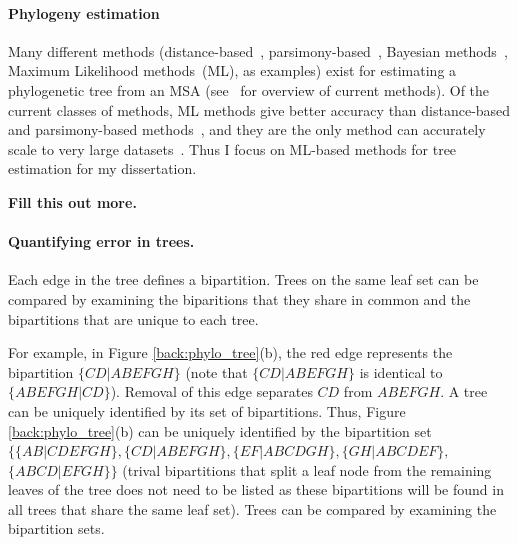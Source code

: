 
\paragraph{Phylogeny estimation}\label{back:tree_estimation}
Many different methods (distance-based~\cite{todo}, parsimony-based~\cite{todo}, Bayesian methods~\cite{todo}, Maximum Likelihood methods~\cite{todo}(ML), as examples) exist for estimating a phylogenetic tree from an MSA (see~\cite{Huelsenbeck1995,Holder2003} for overview of current methods).  Of the current classes of methods, ML methods give better accuracy than distance-based and parsimony-based  methods~\cite{Kuhner1994}, and they are the only method can accurately scale to very large datasets~\cite{Liu2012,Price2010,Stamatakis2014}.  Thus I focus on ML-based methods for tree estimation for my dissertation.  

\textbf{Fill this out more.}


\paragraph{Quantifying error in trees.}  

Each edge in the tree defines a bipartition.  Trees on the same leaf set can be compared by examining the biparitions that they share in common and the bipartitions that are unique to each tree.  

For example, in Figure \ref{back:phylo_tree}(b), the red edge represents the bipartition $\{CD|ABEFGH\}$ (note that $\{CD|ABEFGH\}$ is identical to $\{ABEFGH|CD\}$).  Removal of this edge separates $CD$ from $ABEFGH$.  A tree can be uniquely identified by its set of bipartitions.  Thus, Figure \ref{back:phylo_tree}(b) can be uniquely identified by the bipartition set $\{\{AB|CDEFGH\}, \{CD|ABEFGH\}, \{EF|ABCDGH\},\{GH|ABCDEF\},$ $\{ABCD|EFGH\}\}$ (trival bipartitions that split a leaf node from the remaining leaves of the tree does not need to be listed as these bipartitions will be found in all trees that share the same leaf set).  Trees can be compared by examining the bipartition sets.


